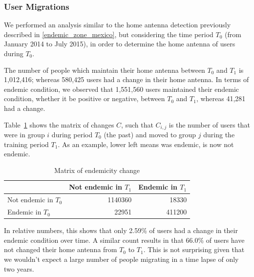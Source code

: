 


\subsubsection{ User Migrations} %

We performed an analysis similar to the home antenna detection previously described in \cref{endemic_zone_mexico},
but considering the time period $T_0$ (from January 2014 to July 2015),
in order to determine the home antenna of users during $T_0$.

The number of people which maintain their home antenna between $T_0$ and $T_1$ is 1,012,416;
whereas 580,425 users had a change in their home antenna.
In terms of endemic condition, we observed that 1,551,560 users maintained their endemic condition, whether it be positive or negative,
between $T_0$ and $T_1$, whereas 41,281 had a change.


%
%
%

Table~\cref{tab:changes}
shows the matrix of changes $C$, such that $C_{i, j}$ is the number of users that were in group $i$ during period $T_0$ (the past) and moved to group $j$ during the training period $T_1$. As an example, lower left means was endemic, is now not endemic.

\begin{table}[ht]
	\caption{Matrix of endemicity change}
	\label{tab:changes}
	\centering
	\begin{tabular}{l r r }
		\toprule
		& Not endemic in $T_1$ & Endemic in $T_1$ \\
		\midrule
		Not endemic in $T_0$ & 1140360 & 18330   \\
		Endemic in $T_0$       & 22951    & 411200 \\
		\bottomrule
	\end{tabular}
\end{table}

In relative numbers, this shows that only 2.59\% of users had a change in their endemic condition over time. A similar count results in that 66.0\% of users have not changed their home antenna from $T_0$ to $T_1$. This is not surprising given that we wouldn't expect a large number of people migrating in a time lapse of only two years.


